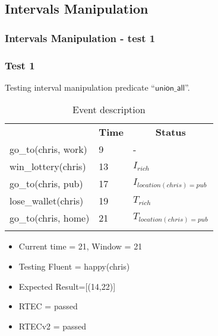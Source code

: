 \documentclass[8pt]{beamer}
\def \patsize {}
\def\unionall{\textsf{\patsize union\_all}}
\begin{document}
\subsection{Intervals Manipulation}
\begin{frame}
    \frametitle{Intervals Manipulation - test 1}
    \subsubsection{Test 1}
    \small Testing interval manipulation predicate ``$\unionall$''.\linebreak
    \begin{minipage}{0.48\linewidth}
        \begin{table}[t!]
            \caption{Event description}
            \begin{center}

                \begin{tabular}{lll}
                    \hline\noalign{\smallskip}
                    \multicolumn{1}{l}{\textbf{Event}} & \multicolumn{1}{c}{\textbf{Time}} & \multicolumn{1}{c}{\textbf{Status}}   \\
                    go\_to(chris, work)& 9 & -\\
                    win\_lottery(chris)& 13 & $I_{rich}$\\
                    go\_to(chris, pub)& 17 & $I_{location(chris)=pub}$\\
                    lose\_wallet(chris)& 19 & $T_{rich}$ \\
                    go\_to(chris, home)& 21 & $T_{location(chris)=pub}$\\
                    \noalign{\smallskip}
                    \hline
                \end{tabular}
            \end{center}
        \end{table}

        \begin{itemize}
            \item Current time = 21, Window = 21
            \item Testing Fluent = happy(chris)
            \item Expected Result=[(14,22)]
            \item RTEC = passed
            \item RTECv2 = passed
        \end{itemize}
    \end{minipage}
    \begin{minipage}{0.48\linewidth}


\end{minipage}
\end{frame}
\end{document}
